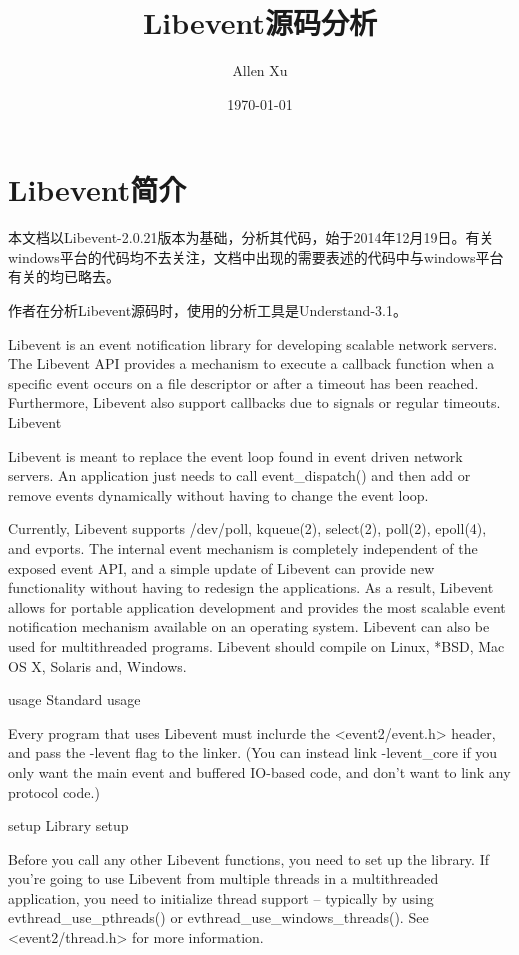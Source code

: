 \documentclass[11pt,a4paper]{article}
\title{Libevent源码分析}
\author{Allen Xu}
\date{\E\today}
\begin{document}
\maketitle

\section{Libevent简介}
本文档以Libevent-2.0.21版本为基础，分析其代码，始于2014年12月19日。有关windows平台的代码均不去关注，文档中出现的需要表述的代码中与windows平台有关的均已略去。

作者在分析Libevent源码时，使用的分析工具是Understand-3.1。

Libevent is an event notification library for developing scalable network servers.  The Libevent API provides a mechanism to execute a callback function when a specific event occurs on a file descriptor or after a timeout has been reached. Furthermore, Libevent also support callbacks due to signals or regular timeouts.
Libevent

Libevent is meant to replace the event loop found in event driven network servers. An application just needs to call event\_dispatch() and then add or remove events dynamically without having to change the event loop.

Currently, Libevent supports /dev/poll, kqueue(2), select(2), poll(2), epoll(4), and evports. The internal event mechanism is completely independent of the exposed event API, and a simple update of Libevent can provide new functionality without having to redesign the applications. As a result, Libevent allows for portable application development and provides the most scalable event notification mechanism available on an operating system.  Libevent can also be used for multithreaded programs.  Libevent should compile on Linux, *BSD, Mac OS X, Solaris and, Windows.

usage Standard usage

Every program that uses Libevent must inclurde the <event2/event.h> header, and pass the -levent flag to the linker.  (You can instead link -levent\_core if you only want the main event and buffered IO-based code, and don't want to link any protocol code.)

setup Library setup

Before you call any other Libevent functions, you need to set up the library.  If you're going to use Libevent from multiple threads in a multithreaded application, you need to initialize thread support -- typically by using evthread\_use\_pthreads() or evthread\_use\_windows\_threads().  See <event2/thread.h> for more information.
\end{document}
